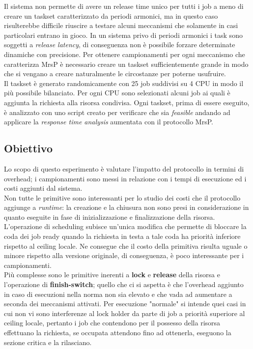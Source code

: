 Il sistema non permette di avere un release time unico per tutti i job a meno di creare un taskset caratterizzato da periodi armonici, ma in questo caso risulterebbe difficile riuscire a testare alcuni meccanismi che solamente in casi particolari entrano in gioco. In un sistema privo di periodi armonici i task sono soggetti a \textit{release latency}, di conseguenza non è possibile forzare determinate dinamiche con precisione. Per ottenere campionamenti per ogni meccanismo che caratterizza MrsP è necessario creare un taskset sufficientemente grande in modo che si vengano a creare naturalmente le circostanze per poterne usufruire.\\
Il taskset è generato randomicamente con 25 job suddivisi su 4 CPU in modo il più possibile bilanciato. Per ogni CPU sono selezionati alcuni job ai quali è aggiunta la richiesta alla risorsa condivisa. Ogni taskset, prima di essere eseguito, è analizzato con uno script creato per verificare che sia \textit{feasible} andando ad applicare la \textit{response time analysis} aumentata con il protocollo MrsP.\\

\subsection{Obiettivo}
\label{sec:overhead_ob}

Lo scopo di questo esperimento è valutare l'impatto del protocollo in termini di overhead; i campionamenti sono messi in relazione con i tempi di esecuzione ed i costi aggiunti dal sistema.\\

Non tutte le primitive sono interessanti per lo studio dei costi che il protocollo aggiunge a \textit{runtime}: la creazione e la chiusura non sono presi in considerazione in quanto eseguite in fase di inizializzazione e finalizzazione della risorsa.\\

L'operazione di scheduling subisce un'unica modifica che permette di bloccare la coda dei job ready quando la richiesta in testa a tale coda ha priorità inferiore rispetto al ceiling locale. Ne consegue che il costo della primitiva risulta uguale o minore rispetto alla versione originale, di conseguenza, è poco interessante per i campionamenti.\\

Più complesse sono le primitive inerenti a \textbf{lock} e \textbf{release} della risorsa e l'operazione di \textbf{finish-switch}; quello che ci si aspetta è che l'overhead aggiunto in caso di esecuzioni nella norma non sia elevato e che vada ad aumentare a seconda dei meccanismi attivati. Per esecuzione "normale" si intende quei casi in cui non vi sono interferenze al lock holder da parte di job a priorità superiore al ceiling locale, pertanto i job che contendono per il possesso della risorsa effettuano la richiesta, se occupata attendono fino ad ottenerla, eseguono la sezione critica e la rilasciano.\\

